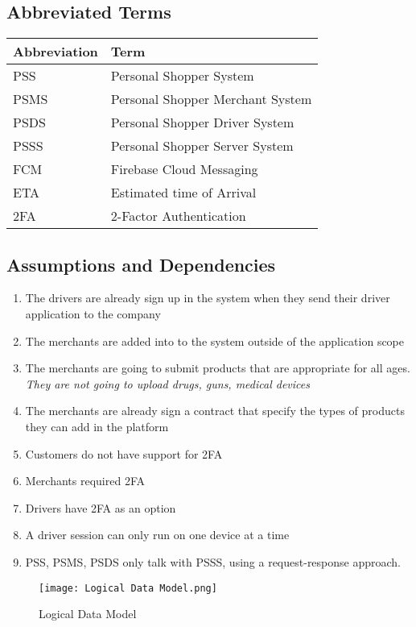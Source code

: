 \subsection{Abbreviated Terms}
\begin{center}
    \begin{tabular}{p{}p{}}
    \hline
    \textbf{Abbreviation} & \textbf{Term} \\ 
     \hline
     PSS & Personal Shopper System \\  
     \hline
     PSMS &  Personal Shopper Merchant System \\  
     \hline
     PSDS &  Personal Shopper Driver System \\  
     \hline
     PSSS &  Personal Shopper Server System \\  
     \hline
     FCM &  Firebase Cloud Messaging \\  
     \hline
     ETA & Estimated time of Arrival \\  
     \hline
     2FA & 2-Factor Authentication  \\  
     \hline
    \end{tabular}
\end{center}

\pagebreak

\subsection{Assumptions and Dependencies}
\begin{enumerate}[label=AS-\arabic*]
    \item The drivers are already sign up in the system when they send their 
    driver application to the company
    \item The merchants are added into to the system outside of the 
    application scope
    \item The merchants are going to submit products that are appropriate for 
    all ages. \textit{They are not going to upload drugs, guns, 
    medical devices}
    \item The merchants are already sign a contract that specify the types of 
    products they can add in the platform
    \item Customers do not have support for 2FA
    \item Merchants required 2FA
    \item Drivers have 2FA as an option
    \item A driver session can only run on one device at a time
    \item PSS, PSMS, PSDS only talk with PSSS, using a 
    request-response approach.
\end{enumerate}
\begin{figure}[!htb]
    \centering
    \texttt{[image: Logical Data Model.png]}
    \caption{Logical Data Model}
\end{figure}

